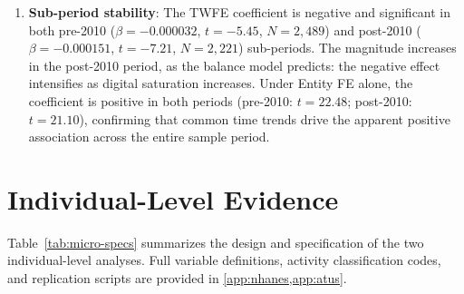 \documentclass[a4paper,11pt,titlepage]{article}
\begin{document}
\begin{enumerate}
  \item \textbf{Sub-period stability}: The TWFE coefficient is negative and significant in both pre-2010 ($\beta = -0.000032$, $t = -5.45$, $N = 2{,}489$) and post-2010 ($\beta = -0.000151$, $t = -7.21$, $N = 2{,}221$) sub-periods. The magnitude increases in the post-2010 period, as the balance model predicts: the negative effect intensifies as digital saturation increases. Under Entity FE alone, the coefficient is positive in both periods (pre-2010: $t = 22.48$; post-2010: $t = 21.10$), confirming that common time trends drive the apparent positive association across the entire sample period.
\end{enumerate}


\section{Individual-Level Evidence}\label{sec:individual}

Table~\ref{tab:micro-specs} summarizes the design and specification of the two individual-level analyses. Full variable definitions, activity classification codes, and replication scripts are provided in \cref{app:nhanes,app:atus}.
\end{document}
